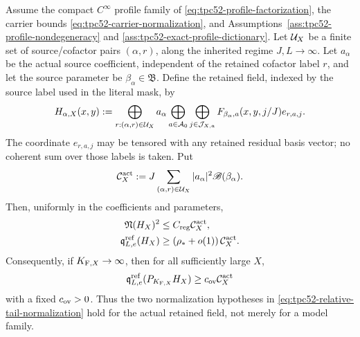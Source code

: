 \begin{proposition}
\label{prop:tpc52-actual-field-normalization}
Assume the compact \(C^\infty\) profile family of
\eqref{eq:tpc52-profile-factorization}, the carrier bounds
\eqref{eq:tpc52-carrier-normalization}, and
Assumptions~\ref{ass:tpc52-profile-nondegeneracy} and
\ref{ass:tpc52-exact-profile-dictionary}.  Let \(\mathcal U_X\) be a
finite set of source/cofactor pairs \((\alpha,r)\), along the inherited
regime \(J,L\to\infty\).  Let \(a_\alpha\) be the actual source coefficient,
independent of the retained cofactor label \(r\), and let the source
parameter be \(\beta_\alpha\in\mathfrak B\).  Define the retained field,
indexed by the
source label used in the literal mask, by
\begin{equation}
 H_{\alpha,X}(x,y)
 :=\bigoplus_{r:(\alpha,r)\in\mathcal U_X}a_\alpha
   \bigoplus_{a\in\mathcal A_0}
   \bigoplus_{j\in\mathcal J_{X,a}}
   F_{\beta_\alpha,a}(x,y,j/J)e_{r,a,j}.
 \label{eq:tpc52-actual-retained-field}
\end{equation}
The coordinate \(e_{r,a,j}\) may be tensored with any retained residual
basis vector; no coherent sum over those labels is taken.  Put
\begin{equation}
 \mathcal C_X^{\rm act}
 :=J\sum_{(\alpha,r)\in\mathcal U_X}|a_\alpha|^2
       \mathscr B(\beta_\alpha).
 \label{eq:tpc52-actual-field-carrier-normalization}
\end{equation}
Then, uniformly in the coefficients and parameters,
\begin{align}
 \mathfrak N(H_X)^2
 &\le C_{\rm reg}\mathcal C_X^{\rm act},
 \label{eq:tpc52-actual-field-regularity}\\
 \mathfrak q_{L,e}^{\rm ref}(H_X)
 &\ge \left(\rho_*+o(1)\right)\mathcal C_X^{\rm act}.
 \label{eq:tpc52-actual-field-reference-overlap}
\end{align}
Consequently, if \(K_{{\rm F},X}\to\infty\), then for all sufficiently large
\(X\),
\begin{equation}
 \mathfrak q_{L,e}^{\rm ref}(P_{K_{{\rm F},X}}H_X)
 \ge c_{\rm ov}\mathcal C_X^{\rm act}
 \label{eq:tpc52-actual-projected-reference-overlap}
\end{equation}
with a fixed \(c_{\rm ov}>0\).  Thus the two normalization hypotheses in
\eqref{eq:tpc52-relative-tail-normalization} hold for the actual retained
field, not merely for a model family.
\end{proposition}

